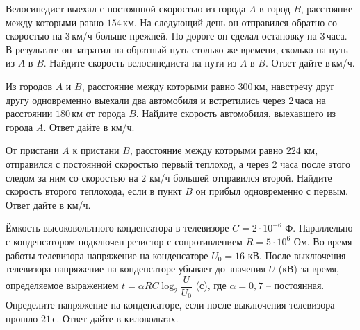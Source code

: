 %
%
\begin{homework}[number=1]
	\begin{listofex}
		\item Велосипедист выехал с постоянной скоростью из города \( A \) в город \( B \), расстояние между которыми равно \( 154 \) км. На следующий день он отправился обратно со скоростью на \( 3 \) км/ч больше прежней. По дороге он сделал остановку на \( 3 \) часа. В результате он затратил на обратный путь столько же времени, сколько на путь из \( A \) в \( B \). Найдите скорость велосипедиста на пути из \( A \) в \( B \). Ответ дайте в км/ч.
		\item Из городов \( A \) и \( B \), расстояние между которыми равно \( 300 \) км, навстречу друг другу одновременно выехали два автомобиля и встретились через \( 2 \) часа на расстоянии \( 180 \) км от города \( B \). Найдите скорость автомобиля, выехавшего из города \( A \). Ответ дайте в км/ч.
		\item От пристани \( A \) к пристани \( B \), расстояние между которыми равно \( 224 \) км, отправился с постоянной скоростью первый теплоход, а через \( 2 \) часа после этого следом за ним со скоростью на \( 2 \) км/ч большей отправился второй. Найдите скорость второго теплохода, если в пункт \( B \) он прибыл одновременно с первым. Ответ дайте в км/ч.
		\item Ёмкость высоковольтного конденсатора в телевизоре \( C=2\cdot10^{-6} \) Ф. Параллельно с конденсатором подключeн резистор с сопротивлением \( R=5\cdot10^6 \) Ом. Во время работы телевизора напряжение на конденсаторе \(  U_0 = 16 \) кВ. После выключения телевизора напряжение на конденсаторе убывает до значения \( U \) (кВ) за время, определяемое выражением \( t=\alpha RC\log_2\dfrac{U}{U_0} \) (с), где \( \alpha=0,7 \) -- постоянная. Определите напряжение на конденсаторе, если после выключения телевизора прошло \( 21 \) с. Ответ дайте в киловольтах.
		\item {}
	\end{listofex}
\end{homework}
%
%
